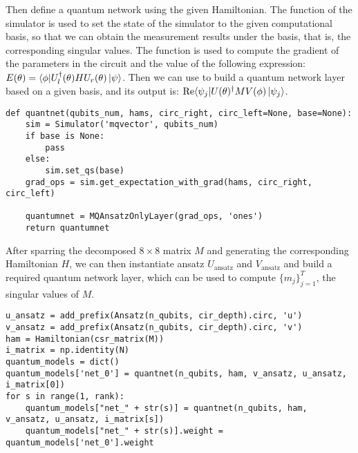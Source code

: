 Then define a quantum network using the given Hamiltonian. The \setqs function of the simulator is used to set the state of the simulator to the given computational basis, so that we can obtain the measurement results under the basis, that is, the corresponding singular values. The \getexpectationwithgrad function is used to compute the gradient of the parameters in the circuit and the value of the following expression: $E(\theta) = \langle\phi| U_l^{\dagger}(\theta) H U_r(\theta)\ket{\psi}$. Then we can use \MQAnsatzOnlyLayer to build a quantum network layer based on a given basis, and its output is: $\text{Re}\langle\psi_j|U(\theta)^{\dagger} M V(\phi)\ket{\psi_j}$.
\begin{lstlisting}
def quantnet(qubits_num, hams, circ_right, circ_left=None, base=None):
    sim = Simulator('mqvector', qubits_num)
    if base is None:
        pass
    else:
        sim.set_qs(base)
    grad_ops = sim.get_expectation_with_grad(hams, circ_right, circ_left)

    quantumnet = MQAnsatzOnlyLayer(grad_ops, 'ones')
    return quantumnet
\end{lstlisting}

After sparring the decomposed $8 \times 8$ matrix $M$ and generating the corresponding Hamiltonian $H$, we can then instantiate ansatz $U_\text{ansatz}$ and $V_\text{ansatz}$ and build a required quantum network layer, which can be used to compute $\{m_j\}_{j=1}^T$, the singular values of $M$.
\begin{lstlisting}
u_ansatz = add_prefix(Ansatz(n_qubits, cir_depth).circ, 'u')
v_ansatz = add_prefix(Ansatz(n_qubits, cir_depth).circ, 'v')
ham = Hamiltonian(csr_matrix(M))
i_matrix = np.identity(N)
quantum_models = dict()
quantum_models['net_0'] = quantnet(n_qubits, ham, v_ansatz, u_ansatz, i_matrix[0])
for s in range(1, rank):
    quantum_models["net_" + str(s)] = quantnet(n_qubits, ham, v_ansatz, u_ansatz, i_matrix[s])
    quantum_models["net_" + str(s)].weight = quantum_models['net_0'].weight
\end{lstlisting}

